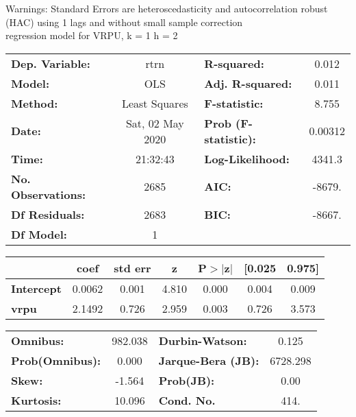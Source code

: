 Warnings: \newline
 [1] Standard Errors are heteroscedasticity and autocorrelation robust (HAC) using 1 lags and without small sample correction\\ 

regression model for VRPU, k = 1 h = 2\begin{center}
\begin{tabular}{lclc}
\toprule
\textbf{Dep. Variable:}    &       rtrn       & \textbf{  R-squared:         } &     0.012   \\
\textbf{Model:}            &       OLS        & \textbf{  Adj. R-squared:    } &     0.011   \\
\textbf{Method:}           &  Least Squares   & \textbf{  F-statistic:       } &     8.755   \\
\textbf{Date:}             & Sat, 02 May 2020 & \textbf{  Prob (F-statistic):} &  0.00312    \\
\textbf{Time:}             &     21:32:43     & \textbf{  Log-Likelihood:    } &    4341.3   \\
\textbf{No. Observations:} &        2685      & \textbf{  AIC:               } &    -8679.   \\
\textbf{Df Residuals:}     &        2683      & \textbf{  BIC:               } &    -8667.   \\
\textbf{Df Model:}         &           1      & \textbf{                     } &             \\
\bottomrule
\end{tabular}
\begin{tabular}{lcccccc}
                   & \textbf{coef} & \textbf{std err} & \textbf{z} & \textbf{P$> |$z$|$} & \textbf{[0.025} & \textbf{0.975]}  \\
\midrule
\textbf{Intercept} &       0.0062  &        0.001     &     4.810  &         0.000        &        0.004    &        0.009     \\
\textbf{vrpu}      &       2.1492  &        0.726     &     2.959  &         0.003        &        0.726    &        3.573     \\
\bottomrule
\end{tabular}
\begin{tabular}{lclc}
\textbf{Omnibus:}       & 982.038 & \textbf{  Durbin-Watson:     } &    0.125  \\
\textbf{Prob(Omnibus):} &   0.000 & \textbf{  Jarque-Bera (JB):  } & 6728.298  \\
\textbf{Skew:}          &  -1.564 & \textbf{  Prob(JB):          } &     0.00  \\
\textbf{Kurtosis:}      &  10.096 & \textbf{  Cond. No.          } &     414.  \\
\bottomrule
\end{tabular}
\end{center}

